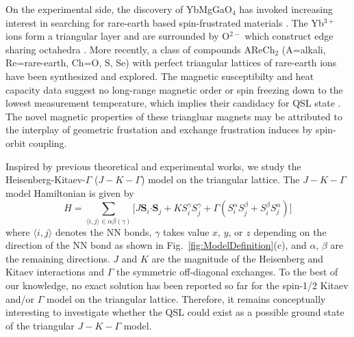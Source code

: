 \documentclass[aps,prb,reprint,amsfonts,amsmath,amssymb,showpacs,groupedaddress,superscriptaddress]{revtex4-1}
\begin{document}
On the experimental side, the discovery of YbMgGaO$_4$ has invoked increasing interest in searching for rare-earth based spin-frustrated materials \cite{srep16419,PhysRevLett.115.167203,PhysRevB.94.035107,PhysRevB.96.054445,PhysRevB.97.184413,PhysRevB.97.125105,PhysRevB.96.075105,PhysRevLett.119.157201}. The Yb$^{3+}$ ions form a triangular layer and are surrounded by O$^{2-}$ which construct edge sharing octahedra \cite{srep16419,PhysRevLett.115.167203}. More recently, a class of compounds AReCh$_2$ (A=alkali, Re=rare-earth, Ch=O, S, Se) with perfect triangular lattices of rare-earth ions have been synthesized and explored. The magnetic susceptibilty and heat capacity data suggest no long-range magnetic order or spin freezing down to the lowest measurement temperature, which implies their candidacy for QSL state \cite{acsmaterialslett.9b00464,PhysRevMaterials.3.114413,arXiv1911.08036,Liu_2018,PhysRevB.99.180401,PhysRevB.100.224417,PhysRevB.100.144432}. The novel magnetic properties of these triangluar magnets may be attributed to the interplay of geometric frustation and exchange frustration induces by spin-orbit coupling.

Inspired by previous theoretical and experimental works, we study the Heisenberg-Kitaev-$\Gamma$ ($J-K-\Gamma$) model on the triangular lattice. The $J-K-\Gamma$ model Hamiltonian is given by
\begin{equation}
    H=\sum_{\langle i,j \rangle \in \alpha \beta (\gamma)} \lbrack J \bm{S}_i \bm{\cdot} \bm{S}_j + K S_i^{\gamma} S_j^{\gamma} + \Gamma (S_i^{\alpha} S_j^{\beta} + S_i^{\beta} S_j^{\alpha}) \rbrack \label{eq:Hamiltonian}
\end{equation}
where $\langle i,j \rangle$ denotes the NN bonds, $\gamma$ takes value $x$, $y$, or $z$ depending on the direction of the NN bond as shown in Fig.~\ref{fig:ModelDefinition}(c), and $\alpha$, $\beta$ are the remaining directions. $J$ and $K$ are the magnitude of the Heisenberg and Kitaev interactions and $\Gamma$ the symmetric off-diagonal exchanges. To the best of our knowledge, no exact solution has been reported so far for the spin-1/2 Kitaev and/or $\Gamma$ model on the triangular lattice. Therefore, it remains conceptually interesting to investigate whether the QSL could exist as a possible ground state of the triangular $J-K-\Gamma$ model.
\end{document}
